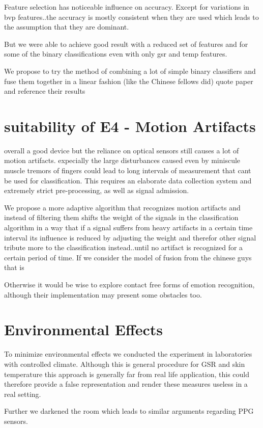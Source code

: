 Feature selection has noticeable influence on accuracy. Except for variations in bvp features..the accuracy is mostly consistent when they are used which leads to the assumption that they are dominant.

But we were able to achieve good result with a reduced set of features and for some of the binary classifications even with only gsr and temp features.

We propose to try the method of combining a lot of simple binary classifiers and fuse them together in a linear fashion (like the Chinese fellows did) quote paper and reference their results

\section{suitability of E4 - Motion Artifacts}
overall a good device but the reliance on optical sensors still causes a lot of motion artifacts. expecially the large disturbances caused even by miniscule muscle tremors of fingers could lead to long intervals of measurement that cant be used for classification. This requires an elaborate data collection system and extremely strict pre-processing, as well as signal admission.

We propose a more adaptive algorithm that recognizes motion artifacts and instead of filtering them shifts the weight of the signals in the classification algorithm in a way that if a signal suffers from heavy artifacts in a certain time interval its influence is reduced by adjusting the weight and therefor other signal tribute more to the classification instead..until no artifact is recognized for a certain period of time. If we consider the model of fusion from the chinese guys that is

Otherwise it would be wise to explore contact free forms of emotion recognition, although their implementation may present some obstacles too.

\section{Environmental Effects}
To minimize environmental effects we conducted the experiment in laboratories with controlled climate. Although this is general procedure for GSR and skin temperature this approach is generally far from real life application, this could therefore provide a false representation and render these measures useless in a real setting.

Further we darkened the room which leads to similar arguments regarding PPG sensors.

